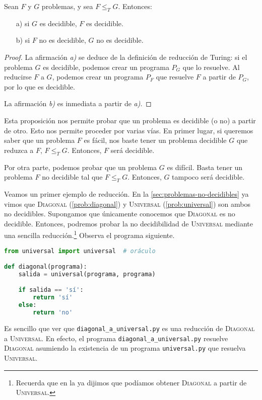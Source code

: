 \begin{proposicion}\label{prop:decidible-reduccion}
Sean $F$ y $G$ problemas, y sea $F\leq_T G$. Entonces:
\begin{itemize}
    \item[a)] si $G$ es decidible, $F$ es decidible.
    \item[b)] si $F$ no es decidible, $G$ no es decidible.
\end{itemize}
\end{proposicion}
\begin{proof}
La afirmación \textit{a)} se deduce de la definición de reducción de Turing: si el problema $G$ es decidible, podemos crear un programa $P_G$ que lo resuelve. Al reducirse $F$ a $G$, podemos crear un programa $P_F$ que resuelve $F$ a partir de $P_G$, por lo que es decidible.

La afirmación \textit{b)} es inmediata a partir de \textit{a)}.
\end{proof}

Esta proposición nos permite probar que un problema es decidible (o no) a partir de otro. Esto nos permite proceder por varias vías. En primer lugar, si queremos saber que un problema $F$ es fácil, nos baste tener un problema decidible $G$ que reduzca a $F$, $F\leq_TG$. Entonces, $F$ será decidible.

Por otra parte, podemos probar que un problema $G$ es difícil. Basta tener un problema $F$ no decidible tal que $F\leq_TG$. Entonces, $G$ tampoco será decidible.


Veamos un primer ejemplo de reducción. En la \cref{sec:problemas-no-decidibles} ya vimos que \textsc{Diagonal} (\cref{prob:diagonal}) y \textsc{Universal} (\cref{prob:universal}) son ambos no decidibles. Supongamos que únicamente conocemos que \textsc{Diagonal} es no decidible. Entonces, podremos probar la no decidibilidad de \textsc{Universal} mediante una sencilla reducción.\footnote{Recuerda que en la  ya dijimos que podíamos obtener \textsc{Diagonal} a partir de \textsc{Universal}.} Observa el programa siguiente.
\vspace{8pt}
\begin{lstlisting}[language=Python, caption=\lstinline{diagonal_a_universal.py},label={lst:diagonal-a-universal}]
from universal import universal  # oráculo

def diagonal(programa):
    salida = universal(programa, programa)

    if salida == 'sí':
        return 'sí'
    else:
        return 'no'
\end{lstlisting}
Es sencillo que ver que \texttt{diagonal\_a\_universal.py} es una reducción de \textsc{Diagonal} a \textsc{Universal}. En efecto, el programa \texttt{diagonal\_a\_universal.py} resuelve \textsc{Diagonal} asumiendo la existencia de un programa \texttt{universal.py} que resuelva \textsc{Universal}.

